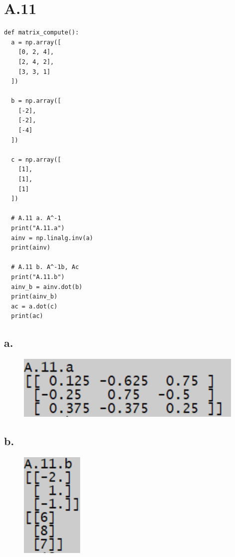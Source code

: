\documentclass{article}
\newcommand{\1}{\mathbf{1}}
\begin{document}
\section*{A.11}
{\Large 

\begin{verbatim}
def matrix_compute():
  a = np.array([
    [0, 2, 4],
    [2, 4, 2],
    [3, 3, 1]
  ])

  b = np.array([
    [-2],
    [-2],
    [-4]
  ])

  c = np.array([
    [1],
    [1],
    [1]
  ])
  
  # A.11 a. A^-1
  print("A.11.a")
  ainv = np.linalg.inv(a)
  print(ainv)

  # A.11 b. A^-1b, Ac
  print("A.11.b")
  ainv_b = ainv.dot(b)
  print(ainv_b)
  ac = a.dot(c)
  print(ac)
\end{verbatim}

\subsection*{a.}

\begin{figure}[ht!]
  \centering
  \includegraphics[width=110mm]{A11a.PNG}
\end{figure}

\subsection*{b.}

\begin{figure}[ht!]
  \centering
  \includegraphics[width=30mm]{A11b.PNG}
\end{figure}

}
\end{document}

